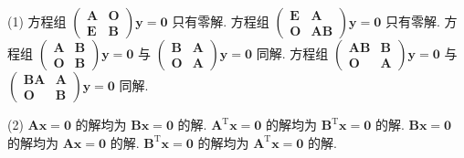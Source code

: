 \begin{tasks}(1)
  \task 方程组 $\displaystyle \begin{pmatrix} \bm{A} & \bm{O} \\ \bm{E} & \bm{B} \end{pmatrix} \bm{y} = \bm{0}$ 只有零解.
  \task 方程组 $\displaystyle \begin{pmatrix} \bm{E} & \bm{A} \\ \bm{O} & \bm{AB} \end{pmatrix} \bm{y} = \bm{0}$ 只有零解.
  \task 方程组 $\displaystyle \begin{pmatrix} \bm{A} & \bm{B} \\ \bm{O} & \bm{B} \end{pmatrix} \bm{y} = \bm{0}$ 与 $\displaystyle \begin{pmatrix} \bm{B} & \bm{A} \\ \bm{O} & \bm{A} \end{pmatrix} \bm{y} = \bm{0}$ 同解.
  \task 方程组 $\displaystyle \begin{pmatrix} \bm{AB} & \bm{B} \\ \bm{O} & \bm{A} \end{pmatrix} \bm{y} = \bm{0}$ 与 $\displaystyle \begin{pmatrix} \bm{BA} & \bm{A} \\ \bm{O} & \bm{B} \end{pmatrix} \bm{y} = \bm{0}$ 同解.
\end{tasks}

\begin{tasks}(2)
  \task $\displaystyle \bm{A}\bm{x}=\bm{0}$ 的解均为 $\displaystyle \bm{Bx}=\bm{0}$ 的解.
  \task $\displaystyle \bm{A}^{\mathrm{T}}\bm{x}=\bm{0}$ 的解均为 $\displaystyle \bm{B}^{\mathrm{T}}\bm{x}=\bm{0}$ 的解.
  \task $\displaystyle \bm{B}\bm{x}=\bm{0}$ 的解均为 $\displaystyle \bm{A}\bm{x}=\bm{0}$ 的解.
  \task $\displaystyle \bm{B}^{\mathrm{T}}\bm{x}=\bm{0}$ 的解均为 $\displaystyle \bm{A}^{\mathrm{T}}\bm{x}=\bm{0}$ 的解.
\end{tasks}
\vspace{6em}

